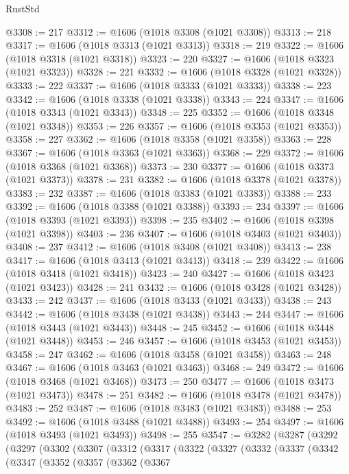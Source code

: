 \begin{lexlean}{RustStd}
\begin{coremodule}
@3308 := 217
@3312 := @1606 (@1018 @3308 (@1021 @3308))
@3313 := 218
@3317 := @1606 (@1018 @3313 (@1021 @3313))
@3318 := 219
@3322 := @1606 (@1018 @3318 (@1021 @3318))
@3323 := 220
@3327 := @1606 (@1018 @3323 (@1021 @3323))
@3328 := 221
@3332 := @1606 (@1018 @3328 (@1021 @3328))
@3333 := 222
@3337 := @1606 (@1018 @3333 (@1021 @3333))
@3338 := 223
@3342 := @1606 (@1018 @3338 (@1021 @3338))
@3343 := 224
@3347 := @1606 (@1018 @3343 (@1021 @3343))
@3348 := 225
@3352 := @1606 (@1018 @3348 (@1021 @3348))
@3353 := 226
@3357 := @1606 (@1018 @3353 (@1021 @3353))
@3358 := 227
@3362 := @1606 (@1018 @3358 (@1021 @3358))
@3363 := 228
@3367 := @1606 (@1018 @3363 (@1021 @3363))
@3368 := 229
@3372 := @1606 (@1018 @3368 (@1021 @3368))
@3373 := 230
@3377 := @1606 (@1018 @3373 (@1021 @3373))
@3378 := 231
@3382 := @1606 (@1018 @3378 (@1021 @3378))
@3383 := 232
@3387 := @1606 (@1018 @3383 (@1021 @3383))
@3388 := 233
@3392 := @1606 (@1018 @3388 (@1021 @3388))
@3393 := 234
@3397 := @1606 (@1018 @3393 (@1021 @3393))
@3398 := 235
@3402 := @1606 (@1018 @3398 (@1021 @3398))
@3403 := 236
@3407 := @1606 (@1018 @3403 (@1021 @3403))
@3408 := 237
@3412 := @1606 (@1018 @3408 (@1021 @3408))
@3413 := 238
@3417 := @1606 (@1018 @3413 (@1021 @3413))
@3418 := 239
@3422 := @1606 (@1018 @3418 (@1021 @3418))
@3423 := 240
@3427 := @1606 (@1018 @3423 (@1021 @3423))
@3428 := 241
@3432 := @1606 (@1018 @3428 (@1021 @3428))
@3433 := 242
@3437 := @1606 (@1018 @3433 (@1021 @3433))
@3438 := 243
@3442 := @1606 (@1018 @3438 (@1021 @3438))
@3443 := 244
@3447 := @1606 (@1018 @3443 (@1021 @3443))
@3448 := 245
@3452 := @1606 (@1018 @3448 (@1021 @3448))
@3453 := 246
@3457 := @1606 (@1018 @3453 (@1021 @3453))
@3458 := 247
@3462 := @1606 (@1018 @3458 (@1021 @3458))
@3463 := 248
@3467 := @1606 (@1018 @3463 (@1021 @3463))
@3468 := 249
@3472 := @1606 (@1018 @3468 (@1021 @3468))
@3473 := 250
@3477 := @1606 (@1018 @3473 (@1021 @3473))
@3478 := 251
@3482 := @1606 (@1018 @3478 (@1021 @3478))
@3483 := 252
@3487 := @1606 (@1018 @3483 (@1021 @3483))
@3488 := 253
@3492 := @1606 (@1018 @3488 (@1021 @3488))
@3493 := 254
@3497 := @1606 (@1018 @3493 (@1021 @3493))
@3498 := 255
@3547 := @3282
    (@3287
      (@3292
        (@3297
          (@3302
            (@3307
              (@3312
                (@3317
                  (@3322
                    (@3327
                      (@3332
                        (@3337
                          (@3342
                            (@3347
                              (@3352
                                (@3357
                                  (@3362
                                    (@3367

\end{coremodule}
\end{lexlean}
